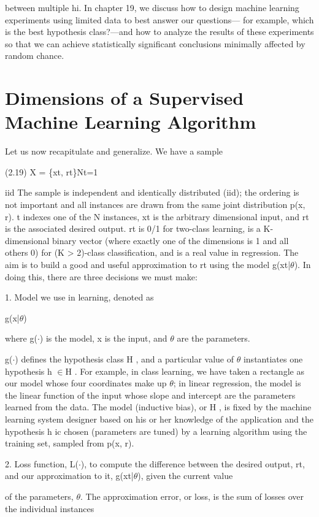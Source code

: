 between multiple hi. In chapter 19, we discuss how to design machine learning experiments using limited data to best answer our questions--- for example, which is the best hypothesis class?---and how to analyze the results of these experiments so that we can achieve statistically significant conclusions minimally affected by random chance.

\section{Dimensions of a Supervised Machine Learning Algorithm}

Let us now recapitulate and generalize. We have a sample

(2.19) X = \{xt, rt\}Nt=1

iid The sample is independent and identically distributed (iid); the ordering is not important and all instances are drawn from the same joint distribution p(x, r). t indexes one of the N instances, xt is the arbitrary dimensional input, and rt is the associated desired output. rt is 0/1 for two-class learning, is a K-dimensional binary vector (where exactly one of the dimensions is 1 and all others 0) for (K > 2)-class classification, and is a real value in regression. The aim is to build a good and useful approximation to rt using the model g(xt|$\theta$). In doing this, there are three decisions we must make:

1. Model we use in learning, denoted as

g(x|$\theta$)

where g($\cdot$) is the model, x is the input, and $\theta$ are the parameters.

g($\cdot$) defines the hypothesis class H , and a particular value of $\theta$ instantiates one hypothesis h $\in$H . For example, in class learning, we have taken a rectangle as our model whose four coordinates make up $\theta$; in linear regression, the model is the linear function of the input whose slope and intercept are the parameters learned from the data. The model (inductive bias), or H , is fixed by the machine learning system designer based on his or her knowledge of the application and the hypothesis h ic chosen (parameters are tuned) by a learning algorithm using the training set, sampled from p(x, r).

2. Loss function, L($\cdot$), to compute the difference between the desired output, rt, and our approximation to it, g(xt|$\theta$), given the current value

of the parameters, $\theta$. The approximation error, or loss, is the sum of losses over the individual instances

